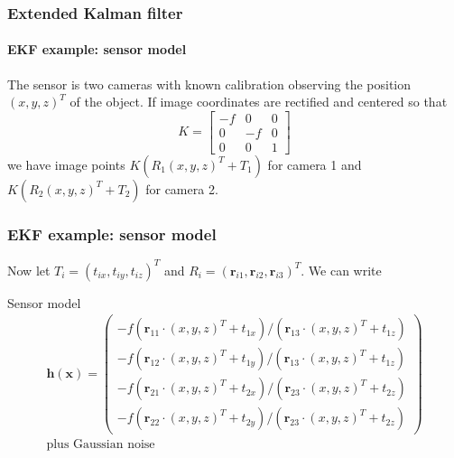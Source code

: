 \documentclass[aspectratio=169]{beamer}
\renewcommand{\vec}[1]{\boldsymbol{#1}}
\begin{document}
\begin{frame}
\frametitle{Extended Kalman filter}
\framesubtitle{EKF example: sensor model}

The sensor is two cameras with known calibration observing the
position $(x,y,z)^T$ of the object.  If image coordinates are
rectified and centered so that
\begin{equation*}
  K = \begin{bmatrix} -f & 0 & 0 \\ 0 & -f & 0 \\ 0 & 0 & 1 \end{bmatrix}
\end{equation*}
we have image points $K ( R_1 ( x, y, z )^T + T_1 )$ for camera 1 and
$K ( R_2 ( x, y, z )^T + T_2 )$ for camera 2.

\end{frame}

\begin{frame}
\frametitle{EKF example: sensor model}

Now let $T_i = ( t_{ix}, t_{iy}, t_{iz} )^T$ and $R_i = (
\vec{r}_{i1}, \vec{r}_{i2}, \vec{r}_{i3} )^T$.  We can write

\begin{block}{Sensor model}
\begin{gather*}
 \vec{h}(\vec{x}) = \begin{pmatrix}
   -f ( \vec{r}_{11} \cdot ( x, y, z )^T + t_{1x} ) /
   ( \vec{r}_{13} \cdot ( x, y, z )^T + t_{1z} ) \\
   -f ( \vec{r}_{12} \cdot ( x, y, z )^T + t_{1y} ) /
   ( \vec{r}_{13} \cdot ( x, y, z )^T + t_{1z} ) \\
   -f ( \vec{r}_{21} \cdot ( x, y, z )^T + t_{2x} ) /
   ( \vec{r}_{23} \cdot ( x, y, z )^T + t_{2z} ) \\
   -f ( \vec{r}_{22} \cdot ( x, y, z )^T + t_{2y} ) /
   ( \vec{r}_{23} \cdot ( x, y, z )^T + t_{2z} )
\end{pmatrix} \\ \text{plus Gaussian noise}
\end{gather*}
\end{block}

\end{frame}
\end{document}
